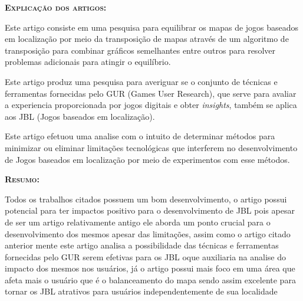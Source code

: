 \documentclass[12pt,a4paper]{article}
\author{Ítalo César Alves de Oliveira}
\begin{document}
\begin{flushleft}
\textbf{\textsc{Explicação dos artigos:}}
\end{flushleft}

	\cite{Maia} Este artigo consiste em uma pesquisa para equilibrar os mapas de jogos baseados em localização por meio da transposição de mapas através de um algoritmo de transposição para combinar gráficos semelhantes entre outros para resolver problemas adicionais para atingir o equilíbrio.
	
	\cite{Nayana} Este artigo produz uma pesquisa para averiguar se o conjunto de técnicas e ferramentas fornecidas pelo GUR (Games User Research), que serve para avaliar a experiencia proporcionada por jogos digitais e obter \textit{insights}, também se aplica aos JBL (Jogos baseados em localização).
	
	\cite{Luis} Este artigo efetuou uma analise com o intuito de determinar métodos para minimizar ou eliminar limitações tecnológicas que interferem no desenvolvimento de Jogos baseados em localização por meio de experimentos com esse métodos.
	
\begin{flushleft}
\textbf{\textsc{Resumo:}}
\end{flushleft}

	Todos os trabalhos citados possuem um bom desenvolvimento, o artigo \cite{Luis} possui potencial para ter impactos positivo para o desenvolvimento de JBL pois apesar de ser um artigo relativamente antigo ele aborda um ponto crucial para o desenvolvimento dos mesmos apesar das limitações, assim como o artigo citado anterior mente este artigo \cite{Nayana} analisa a possibilidade das técnicas e ferramentas fornecidas pelo GUR serem efetivas para os JBL oque auxiliaria na analise do impacto dos mesmos nos usuários, já o artigo \cite{Maia} possui mais foco em uma área que afeta mais o usuário que é o balanceamento do mapa sendo assim excelente para tornar os JBL atrativos para usuários independentemente de sua localidade



\end{document}
